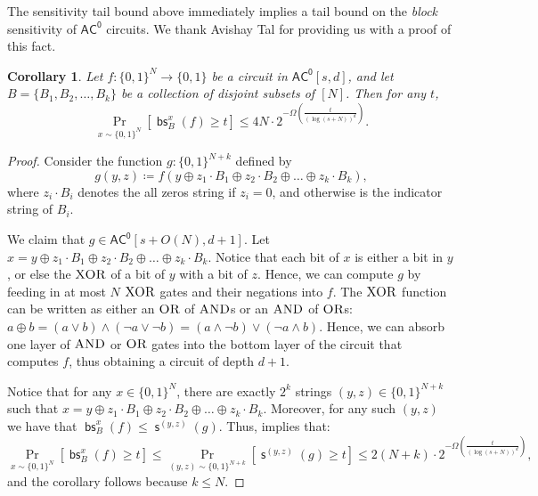 \documentclass[11pt]{article}%
\newtheorem{corollary}[theorem]{Corollary}
\newcommand{\AND}{\normalfont\textsc{AND}} %
\newcommand{\OR}{\normalfont\textsc{OR}}
\newcommand{\XOR}{\normalfont\textsc{XOR}}
\DeclareMathOperator{\s}{\mathsf{s}}
\DeclareMathOperator{\bs}{\mathsf{bs}}
\begin{document}
The sensitivity tail bound above immediately implies a tail bound on the \textit{block} sensitivity of $\mathsf{AC^0}$ circuits. We thank Avishay Tal for providing us with a proof of this fact.

\begin{corollary}
\label{cor:ac0_block_sensitivity_tail_bound}
Let $f: \{0,1\}^N \to \{0,1\}$ be a circuit in $\mathsf{AC^0}[s, d]$, and let $B = \{B_1,B_2,\ldots,B_k\}$ be a collection of disjoint subsets of $[N]$. Then for any $t$,
\[
\Pr_{x \sim \{0,1\}^N} \left[ \bs_B^x(f) \ge t \right] \le 4N\cdot 2^{-\Omega\left(\frac{t}{(\log (s + N))^{d}}\right)}.
\]
\end{corollary}
\begin{proof}
Consider the function $g: \{0,1\}^{N + k}$ defined by
\[
g(y, z) \coloneqq f\left(y \oplus z_1 \cdot B_1 \oplus z_2 \cdot B_2 \oplus \ldots \oplus z_k \cdot B_k\right),
\]
where $z_i \cdot B_i$ denotes the all zeros string if $z_i = 0$, and otherwise is the indicator string of $B_i$.

We claim that $g \in \mathsf{AC^0}[s + O(N), d+1]$. Let $x = y \oplus z_1 \cdot B_1 \oplus z_2 \cdot B_2 \oplus \ldots \oplus z_k \cdot B_k$. Notice that each bit of $x$ is either a bit in $y$, or else the $\XOR$ of a bit of $y$ with a bit of $z$. Hence, we can compute $g$ by feeding in at most $N$ $\XOR$ gates and their negations into $f$. The $\XOR$ function can be written as either an $\OR$ of $\AND$s or an $\AND$ of $\OR$s: $a \oplus b = (a \lor b) \land (\lnot a \lor \lnot b) = (a \land \lnot b) \lor (\lnot a \land  b)$. Hence, we can absorb one layer of $\AND$ or $\OR$ gates into the bottom layer of the circuit that computes $f$, thus obtaining a circuit of depth $d+1$.

Notice that for any $x \in \{0,1\}^N$, there are exactly $2^k$ strings $(y, z) \in \{0,1\}^{N + k}$ such that $x = y \oplus z_1 \cdot B_1 \oplus z_2 \cdot B_2 \oplus \ldots \oplus z_k \cdot B_k$. Moreover, for any such $(y, z)$ we have that $\bs_B^x(f) \le \s^{(y,z)}(g)$. Thus,  implies that:
\[
\Pr_{x \sim \{0,1\}^N} \left[ \bs_B^x(f) \ge t \right] \le \Pr_{(y, z) \sim \{0,1\}^{N + k}} \left[ \s^{(y, z)}(g) \ge t \right] \le 2(N + k)\cdot 2^{-\Omega\left(\frac{t}{(\log (s + N))^{d}}\right)},
\]
and the corollary follows because $k \le N$.
\end{proof}
\end{document}
